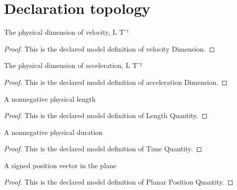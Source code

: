 \section{Declaration topology}
\begin{definition}
  \label{def:physics:phyx-mini-0686:phyxminiproblems-problemphyxmini0686-velocitydimension}
  The physical dimension of velocity, L T⁻¹
\end{definition}
\begin{proof}
  This is the declared model definition of velocity Dimension.
\end{proof}
\begin{definition}
  \label{def:physics:phyx-mini-0686:phyxminiproblems-problemphyxmini0686-accelerationdimension}
  The physical dimension of acceleration, L T⁻²
\end{definition}
\begin{proof}
  This is the declared model definition of acceleration Dimension.
\end{proof}
\begin{definition}
  \label{def:physics:phyx-mini-0686:phyxminiproblems-problemphyxmini0686-lengthquantity}
  A nonnegative physical length
\end{definition}
\begin{proof}
  This is the declared model definition of Length Quantity.
\end{proof}
\begin{definition}
  \label{def:physics:phyx-mini-0686:phyxminiproblems-problemphyxmini0686-timequantity}
  A nonnegative physical duration
\end{definition}
\begin{proof}
  This is the declared model definition of Time Quantity.
\end{proof}
\begin{definition}
  \label{def:physics:phyx-mini-0686:phyxminiproblems-problemphyxmini0686-planarpositionquantity}
  A signed position vector in the plane
\end{definition}
\begin{proof}
  This is the declared model definition of Planar Position Quantity.
\end{proof}

